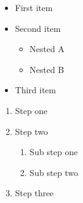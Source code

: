 \begin{itemize}
  \item First item
  \item Second item
    \begin{itemize}
      \item Nested A
      \item Nested B
    \end{itemize}
  \item Third item
\end{itemize}

\begin{enumerate}
  \item Step one
  \item Step two
    \begin{enumerate}
      \item Sub step one
      \item Sub step two
    \end{enumerate}
  \item Step three
\end{enumerate}
